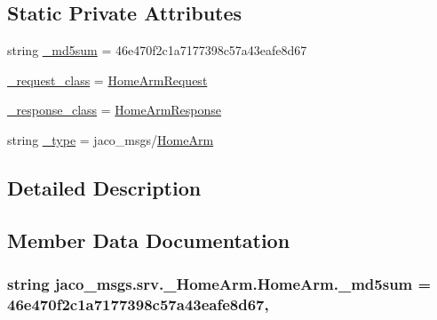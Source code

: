 \subsection*{Static Private Attributes}
\begin{DoxyCompactItemize}
\item 
string \hyperlink{classjaco__msgs_1_1srv_1_1__HomeArm_1_1HomeArm_ae6dea4f2ac597e756265cfc3921ba2cd}{\+\_\+md5sum} = \textquotesingle{}46e470f2c1a7177398c57a43eafe8d67\textquotesingle{}
\item 
\hyperlink{classjaco__msgs_1_1srv_1_1__HomeArm_1_1HomeArm_a7fa586c9db23a0b867b3f65f5077e15b}{\+\_\+request\+\_\+class} = \hyperlink{classjaco__msgs_1_1srv_1_1__HomeArm_1_1HomeArmRequest}{Home\+Arm\+Request}
\item 
\hyperlink{classjaco__msgs_1_1srv_1_1__HomeArm_1_1HomeArm_a73d2e1a1451c2e1397b41e632843c191}{\+\_\+response\+\_\+class} = \hyperlink{classjaco__msgs_1_1srv_1_1__HomeArm_1_1HomeArmResponse}{Home\+Arm\+Response}
\item 
string \hyperlink{classjaco__msgs_1_1srv_1_1__HomeArm_1_1HomeArm_ad6f6260f6714fdf91c51b9583a8629a7}{\+\_\+type} = \textquotesingle{}jaco\+\_\+msgs/\hyperlink{classjaco__msgs_1_1srv_1_1__HomeArm_1_1HomeArm}{Home\+Arm}\textquotesingle{}
\end{DoxyCompactItemize}


\subsection{Detailed Description}


\subsection{Member Data Documentation}
\subsubsection[{\texorpdfstring{\+\_\+md5sum}{_md5sum}}]{\setlength{\rightskip}{0pt plus 5cm}string jaco\+\_\+msgs.\+srv.\+\_\+\+Home\+Arm.\+Home\+Arm.\+\_\+md5sum = \textquotesingle{}46e470f2c1a7177398c57a43eafe8d67\textquotesingle{}\hspace{0.3cm}{\ttfamily [static]}, {\ttfamily [private]}}\hypertarget{classjaco__msgs_1_1srv_1_1__HomeArm_1_1HomeArm_ae6dea4f2ac597e756265cfc3921ba2cd}{}\label{classjaco__msgs_1_1srv_1_1__HomeArm_1_1HomeArm_ae6dea4f2ac597e756265cfc3921ba2cd}
